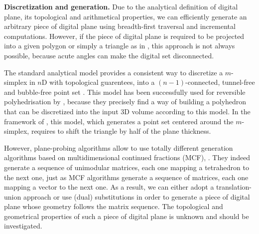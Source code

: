 
\noindent\textbf{Discretization and generation.}
Due to the analytical definition of digital plane, its topological and
arithmetical properties, we can efficiently generate an arbitrary piece
of digital plane using breadth-first traversal and incremental computations.
However, if the piece of digital plane is required to be projected into a
given polygon or simply a triangle as in \cite{LPRJMIV2017}, this approach
is not always possible, because acute angles can make the digital set disconnected. 

The standard analytical model provides a consistent way to discretize a $m$-simplex
in $n$D with topological guarentees, \ie into a $(n-1)$-connected, tunnel-free
and bubble-free point set \cite{Andres2003}. This model has been successfully
used for reversible polyhedrisation by \citeauthor*{Sivignon2004} \cite{Sivignon2004},
because they precisely find a way of building a polyhedron that can be
discretized into the input 3D volume according to this model.
In the framework of \cite{LPRJMIV2017}, this model, which generates a point set
centered around the $m$-simplex, requires to shift the triangle by half of the
plane thickness.

However, plane-probing algorithms allow to use totally different generation algorithms
based on multidimensional continued fractions (MCF), \eg \cite{Fernique2009,Jamet2016}. 
They indeed generate a sequence of unimodular matrices, each one mapping a tetrahedron to
the next one, just as MCF algorithms generate a sequence of matrices, each one mapping
a vector to the next one. As a result, we can either adopt a translation-union approach \cite{Jamet2016}
or use (dual) substitutions \cite{Fernique2009} in order to generate a piece
of digital plane whose geometry follows the matrix sequence. The topological and geometrical
properties of such a piece of digital plane is unknown and should be investigated. 

